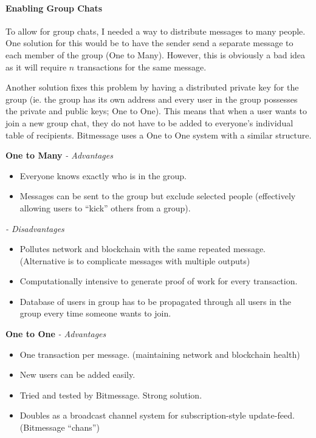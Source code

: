 \documentclass{article}
\begin{document}
\paragraph{Enabling Group Chats}
To allow for group chats, I needed a way to distribute messages to many people. One solution for this would be to have the sender send a separate message to each member of the group (One to Many). However, this is obviously a bad idea as it will require $n$ transactions for the same message.

Another solution fixes this problem by having a distributed private key for the group (ie. the group has its own address and every user in the group possesses the private  and public keys; One to One). This means that when a user wants to join a new group chat, they do not have to be added to everyone's individual table of recipients. Bitmessage uses a One to One system with a similar structure.

\newpage

\textbf{One to Many}
\textit{ - Advantages}
\begin{itemize}
    \item Everyone knows exactly who is in the group.
    \item Messages can be sent to the group but exclude selected people (effectively allowing users to ``kick'' others from a group).
\end{itemize}

\textit{ - Disadvantages}
\begin{itemize}
    \item Pollutes network and blockchain with the same repeated message. (Alternative is to complicate messages with multiple outputs)
    \item Computationally intensive to generate proof of work for every transaction.
    \item Database of users in group has to be propagated through all users in the group every time someone wants to join.
\end{itemize}


\textbf{One to One}
\textit{ - Advantages}
\begin{itemize}
    \item One transaction per message. (maintaining network and blockchain health)
    \item New users can be added easily.
    \item Tried and tested by Bitmessage. Strong solution.
    \item Doubles as a broadcast channel system for subscription-style update-feed. (Bitmessage ``chans'')
\end{itemize}
\end{document}
